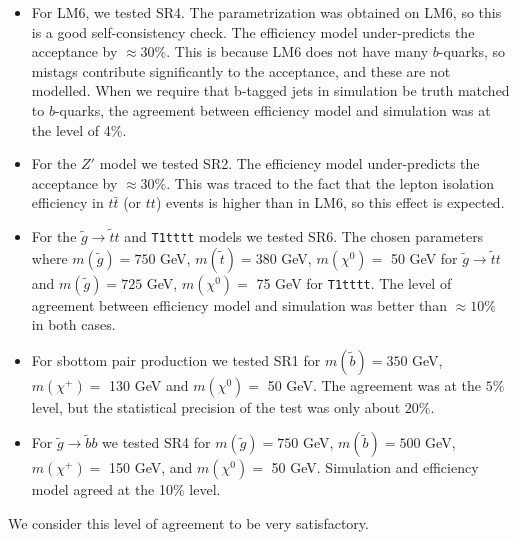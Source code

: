 \begin{itemize}

\item For LM6, we tested SR4.  The parametrization was obtained on
LM6, so this is a good self-consistency check.  The efficiency
model under-predicts the acceptance by $\approx 30\%$.  This is because LM6
does not have many $b$-quarks, so mistags contribute 
significantly to the acceptance, and these are not modelled. 
When we require that b-tagged jets in simulation 
be truth matched to $b$-quarks, the agreement between 
efficiency model and simulation was at the level of 4\%.

\item For the $Z'$ model we tested SR2.  The efficiency model 
under-predicts the acceptance by $\approx 30\%$.  This was traced to 
the fact that the lepton isolation efficiency in $t\bar{t}$ (or $tt$)
events is higher than in LM6, so this effect is expected.

\item For the $\tilde{g} \to \tilde{t}t$ and {\tt T1tttt} 
models we tested SR6.
The chosen parameters where $m(\tilde{g}) = 750$ GeV, 
$m(\tilde{t}) = 380$ GeV, $m(\chi^0)=$ 50 GeV for  
$\tilde{g} \to \tilde{t}t$ and $m(\tilde{g}) = 725$ GeV, 
$m(\chi^0)=$ 75 GeV for {\tt T1tttt}.  The level 
of agreement between efficiency model and simulation was 
better than $\approx 10\%$ in both cases.

\item For sbottom pair production we tested SR1 for
$m(\tilde{b}) = 350$ GeV, $m(\chi^+)=$ 130 GeV and
$m(\chi^0)=$ 50 GeV.  The agreement was at the $5\%$
level, but the statistical precision of the test was only 
about $20\%$.

\item For $\tilde{g} \to \tilde{b}b$ we tested SR4
for $m(\tilde{g}) = 750$ GeV, 
$m(\tilde{b}) = 500$ GeV, $m(\chi^+)=$ 150 GeV, and 
$m(\chi^0)=$ 50 GeV.  Simulation and efficiency model
agreed at the 10\% level.

\end{itemize}

\noindent We consider this level of agreement to be very satisfactory.





